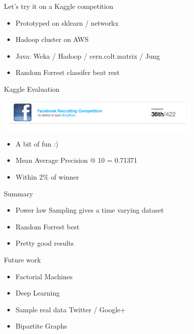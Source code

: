 \documentclass{beamer}
\begin{document}
\begin{frame}{Let's try it on a Kaggle competition}
  \begin{itemize}
  	\item Prototyped on sklearn / networkx
   	\item Hadoop cluster on AWS
   	\item Java: Weka / Hadoop / cern.colt.matrix / Jung
   	\item Random Forrest classifer beat rest
  \end{itemize}
\end{frame}


\begin{frame}{Kaggle Evaluation}

\includegraphics[width=10cm]{kaggle}

  \begin{itemize}
	\item A bit of fun :)
	\pause
	\item  Mean Average Precision @ 10 = 0.71371
	\pause
	\item  Within 2\% of winner
  \end{itemize}
  
\end{frame}

\begin{frame}{Summary}
  \begin{itemize}
\item Power law Sampling gives a time varying dataset
	\pause
\item Random Forrest best
	\pause
\item Pretty good results

  \end{itemize}
\end{frame}

\begin{frame}{Future work}
  \begin{itemize}
\item Factorial Machines
\item Deep Learning
\item Sample real data Twitter / Google+
\item Bipartite Graphs
  \end{itemize}
\end{frame}
\end{document}
